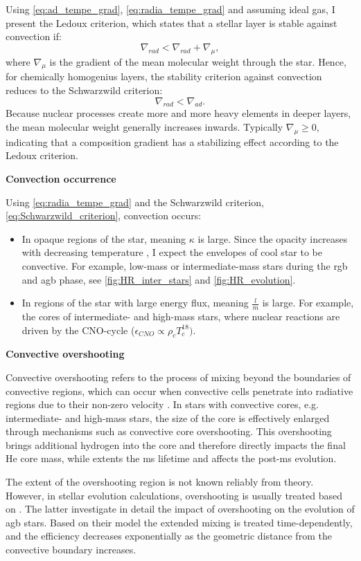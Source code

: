 Using \cref{eq:ad_tempe_grad}, \cref{eq:radia_tempe_grad} and assuming ideal gas, I present the Ledoux criterion,  which states that a stellar layer is stable against convection if:
\begin{equation}\label{eq:Ledoux_criterion}
    \nabla_{rad} < \nabla_{rad} +  \nabla_{\mu},
\end{equation}
where $\nabla_{\mu}$ is the gradient of the mean molecular weight through the star. Hence, for chemically homogenius layers, the stability criterion against convection reduces to the Schwarzwild criterion:
\begin{equation}\label{eq:Schwarzwild_criterion}
    \nabla_{rad} < \nabla_{ad}.
\end{equation}
Because nuclear processes create more and more heavy elements in deeper layers, the mean molecular weight generally increases inwards. Typically $\nabla_{\mu} \geq 0$, indicating that a composition gradient has a stabilizing effect according to the Ledoux criterion. 

{\bf Convection occurrence}

Using \cref{eq:radia_tempe_grad} and the Schwarzwild criterion, \cref{eq:Schwarzwild_criterion}, convection occurs:
\begin{itemize}
    \item In opaque regions of the star, meaning $\kappa$ is large. Since the opacity increases with decreasing temperature \citep{pols2011stellar}, I expect the envelopes of cool star to be convective. For example, low-mass or intermediate-mass stars during the \ac{rgb} and \ac{agb} phase, see \cref{fig:HR_inter_stars} and \cref{fig:HR_evolution}.
    \item In regions of the star with large energy flux, meaning $\frac{l}{m}$ is large. For example, the cores of intermediate- and high-mass stars, where nuclear reactions are driven by the CNO-cycle ($\epsilon_{CNO} \propto \rho_c T_{c}^{18})$.
\end{itemize}

{\bf Convective overshooting}

Convective overshooting refers to the process of mixing beyond the boundaries of convective regions, which can occur when convective cells penetrate into radiative regions due to their non-zero velocity \citep{alongi1993evolutionary,brott2011rotating,schootemeijer2019constraining}. In stars with convective cores, e.g. intermediate- and high-mass stars, the size of the core is effectively enlarged through mechanisms such as convective core overshooting. This overshooting brings additional hydrogen into the core and therefore directly impacts the final He core mass, while extents the \ac{ms} lifetime and affects the post-\ac{ms} evolution.

The extent of the overshooting region is not known reliably from theory. However, in stellar evolution calculations, overshooting is usually treated based on \cite{herwig2000evolution}. The latter investigate in detail the impact of overshooting on the evolution of \ac{agb} stars. Based on their model the extended mixing is treated time-dependently, and the efficiency decreases exponentially as the geometric distance from the convective boundary increases. 

